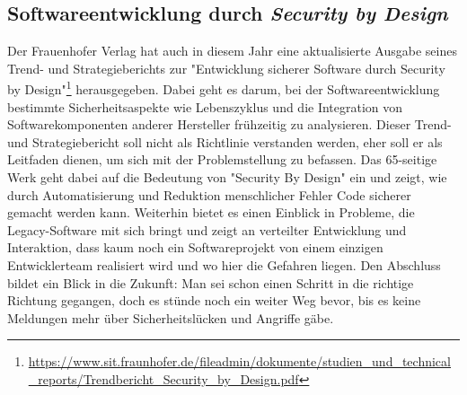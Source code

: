 \subsection{Softwareentwicklung durch \textit{Security by Design}}
Der Frauenhofer Verlag hat auch in diesem Jahr eine aktualisierte 
Ausgabe seines Trend- und Strategieberichts zur "Entwicklung sicherer 
Software durch Security by Design"\footnote{\url{https://www.sit.fraunhofer.de/fileadmin/dokumente/studien_und_technical_reports/Trendbericht_Security_by_Design.pdf}} 
herausgegeben.
Dabei geht es darum, bei der Softwareentwicklung bestimmte
Sicherheitsaspekte wie Lebenszyklus und die Integration von 
Softwarekomponenten anderer Hersteller frühzeitig zu analysieren.
Dieser Trend- und Strategiebericht soll nicht als Richtlinie verstanden
werden, eher soll er als Leitfaden dienen, um sich mit der Problemstellung
zu befassen.
Das 65-seitige Werk geht dabei auf die Bedeutung von "Security By Design" ein
und zeigt, wie durch Automatisierung und Reduktion menschlicher Fehler
Code sicherer gemacht werden kann. Weiterhin bietet es einen Einblick
in Probleme, die Legacy-Software mit sich bringt und zeigt an verteilter 
Entwicklung und Interaktion, dass kaum noch ein Softwareprojekt von einem
einzigen Entwicklerteam realisiert wird und wo hier die Gefahren liegen.
Den Abschluss bildet ein Blick in die Zukunft: Man sei schon einen Schritt in die richtige Richtung gegangen, doch es  
stünde noch ein weiter Weg bevor, bis es keine Meldungen mehr 
über Sicherheitslücken und Angriffe gäbe.
